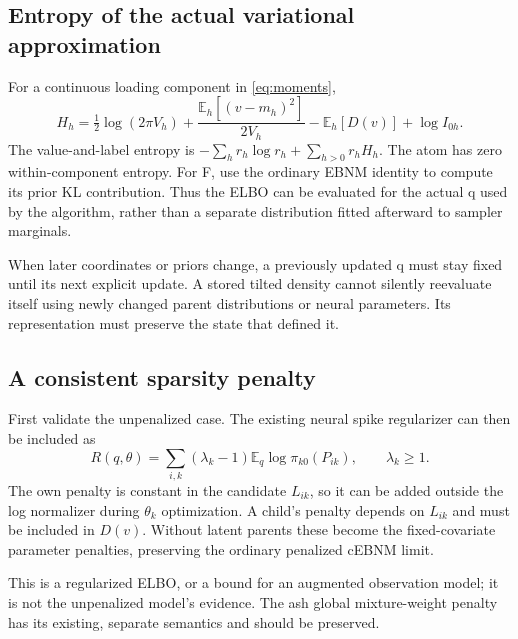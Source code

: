 \documentclass[11pt,a4paper]{article}
\newcommand{\E}{\mathbb E}
\begin{document}
\subsection{Entropy of the actual variational approximation}
For a continuous loading component in \eqref{eq:moments},
\begin{equation}
H_h=\tfrac12\log(2\pi V_h)
+\frac{\E_h[(v-m_h)^2]}{2V_h}-\E_h[D(v)]+\log I_{0h}.
\label{eq:entropy}
\end{equation}
The value-and-label entropy is
\(-\sum_hr_h\log r_h+\sum_{h>0}r_hH_h\). The atom has zero
within-component entropy. For F, use the ordinary EBNM identity to compute
its prior KL contribution. Thus the ELBO can be evaluated for the actual
q used by the algorithm, rather than a separate distribution fitted
afterward to sampler marginals.

When later coordinates or priors change, a previously updated q must stay
fixed until its next explicit update. A stored tilted density cannot silently
reevaluate itself using newly changed parent distributions or neural
parameters. Its representation must preserve the state that defined it.

\subsection{A consistent sparsity penalty}
First validate the unpenalized case. The existing neural spike regularizer
can then be included as
\begin{equation}
R(q,\theta)=\sum_{i,k}(\lambda_k-1)
\E_q\log\pi_{k0}(P_{ik}),\qquad \lambda_k\geq1.
\label{eq:penalty}
\end{equation}
The own penalty is constant in the candidate \(L_{ik}\), so it can be added outside
the log normalizer during \(\theta_k\) optimization. A child's penalty depends
on \(L_{ik}\) and must be included in \(D(v)\). Without latent parents these become
the fixed-covariate parameter penalties, preserving the ordinary penalized
cEBNM limit.

This is a regularized ELBO, or a bound for an augmented observation model;
it is not the unpenalized model's evidence. The ash global mixture-weight
penalty has its existing, separate semantics and should be preserved.

\clearpage
\end{document}
